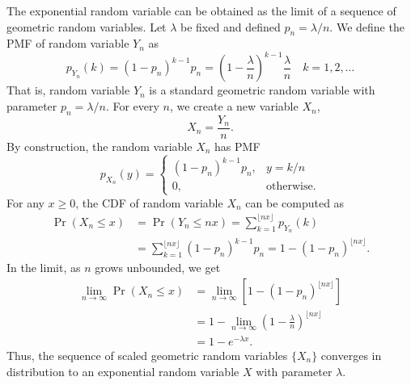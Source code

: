 The exponential random variable can be obtained as the limit of a sequence of geometric random variables.
Let $\lambda$ be fixed and defined $p_n = \lambda/n$.
We define the PMF of random variable $Y_n$ as
\begin{equation*}
p_{Y_n} (k) = (1 - p_n)^{k-1} p_n
= \left( 1 - \frac{\lambda}{n} \right)^{k-1} \frac{\lambda}{n}
\quad k = 1, 2, \ldots
\end{equation*}
That is, random variable $Y_n$ is a standard geometric random variable with parameter $p_n = \lambda/n$.
For every $n$, we create a new variable $X_n$,
\begin{equation*}
X_n = \frac{Y_n}{n}.
\end{equation*}
By construction, the random variable $X_n$ has PMF
\begin{equation*}
p_{X_n} (y) = \begin{cases}
(1 - p_n)^{k-1} p_n, & y = k/n \\
0, & \text{otherwise} .
\end{cases}
\end{equation*}
For any $x \geq 0$, the CDF of random variable $X_n$ can be computed as
\begin{equation*}
\begin{split}
\Pr (X_n \leq x)
&= \Pr (Y_n \leq n x)
= \sum_{k = 1}^{\lfloor n x \rfloor} p_{Y_n} (k) \\
&= \sum_{k = 1}^{\lfloor n x \rfloor} (1 - p_n)^{k-1} p_n
= 1 - (1 - p_n)^{\lfloor n x \rfloor} .
\end{split}
\end{equation*}
In the limit, as $n$ grows unbounded, we get
\begin{equation*}
\begin{split}
\lim_{n \rightarrow \infty} \Pr (X_n \leq x)
&= \lim_{n \rightarrow \infty} \left[ 1 - (1 - p_n)^{\lfloor n x \rfloor} \right] \\
&= 1 - \lim_{n \rightarrow \infty}
\left( 1 - \frac{\lambda}{n} \right)^{\lfloor n x \rfloor} \\
&= 1 - e^{- \lambda x} .
\end{split}
\end{equation*}
Thus, the sequence of scaled geometric random variables $\{ X_n \}$ converges in distribution to an exponential random variable $X$ with parameter $\lambda$.

